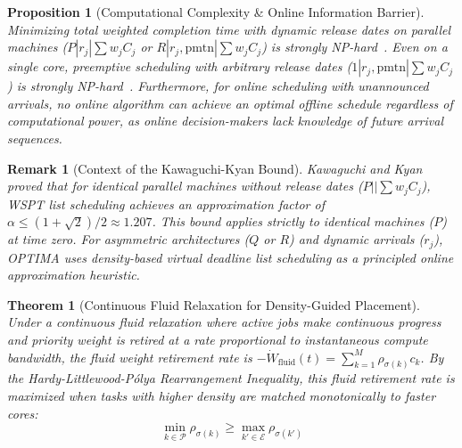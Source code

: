 \documentclass[letterpaper,twocolumn,10pt]{article}
\newtheorem{theorem}{Theorem}
\newtheorem{proposition}{Proposition}
\newtheorem{remark}{Remark}
\begin{document}
\begin{proposition}[Computational Complexity \& Online Information Barrier]
\label{prop:np_hard}
Minimizing total weighted completion time with dynamic release dates on parallel machines ($P | r_j | \sum w_j C_j$ or $R | r_j, \text{pmtn} | \sum w_j C_j$) is strongly NP-hard~\cite{lenstra1977complexity,garey1979computers}. Even on a single core, preemptive scheduling with arbitrary release dates ($1 | r_j, \text{pmtn} | \sum w_j C_j$) is strongly NP-hard~\cite{lenstra1977complexity}. Furthermore, for online scheduling with unannounced arrivals, no online algorithm can achieve an optimal offline schedule regardless of computational power, as online decision-makers lack knowledge of future arrival sequences.
\end{proposition}

\begin{remark}[Context of the Kawaguchi-Kyan Bound]
\label{rem:kawaguchi_kyan}
Kawaguchi and Kyan~\cite{kawaguchi1986worst} proved that for identical parallel machines without release dates ($P || \sum w_j C_j$), WSPT list scheduling achieves an approximation factor of $\alpha \le (1+\sqrt{2})/2 \approx 1.207$. This bound applies strictly to identical machines ($P$) at time zero. For asymmetric architectures ($Q$ or $R$) and dynamic arrivals ($r_j$), OPTIMA uses density-based virtual deadline list scheduling as a principled online approximation heuristic.
\end{remark}

\begin{theorem}[Continuous Fluid Relaxation for Density-Guided Placement]
\label{thm:rearrangement}
Under a continuous fluid relaxation where active jobs make continuous progress and priority weight is retired at a rate proportional to instantaneous compute bandwidth, the fluid weight retirement rate is $-\dot{W}_{\mathrm{fluid}}(t) = \sum_{k=1}^M \rho_{\sigma(k)} c_k$. By the Hardy-Littlewood-P\'olya Rearrangement Inequality, this fluid retirement rate is maximized when tasks with higher density are matched monotonically to faster cores:
\begin{equation}
\min_{k \in \mathcal{P}} \rho_{\sigma(k)} \ge \max_{k' \in \mathcal{E}} \rho_{\sigma(k')}
\end{equation}
\end{theorem}
\end{document}
